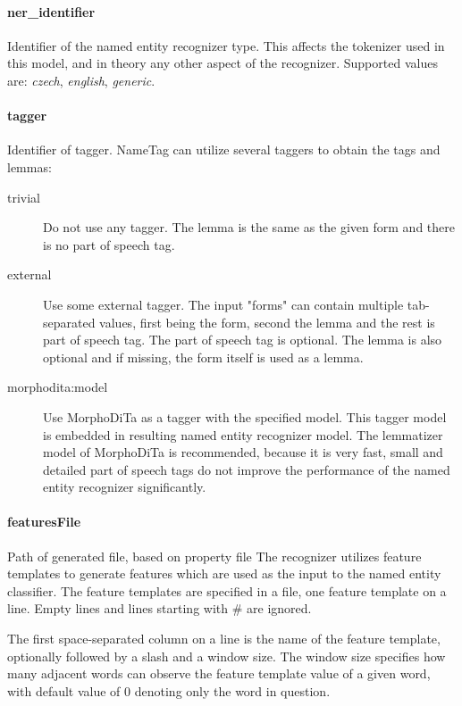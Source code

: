 \paragraph{ner\_identifier}
Identifier of the named entity recognizer type. This affects the tokenizer used
in this model, and in theory any other aspect of the recognizer. Supported values
are: \emph{czech}, \emph{english}, \emph{generic}.

\paragraph{tagger}
Identifier of tagger. NameTag can utilize several taggers to obtain the tags and lemmas:

\begin{description}
\item[trivial]
Do not use any tagger. The lemma is the same as the given form and there is no
part of speech tag.
\item[external]
Use some external tagger. The input "forms" can contain multiple tab-separated
values, first being the form, second the lemma and the rest is part of speech tag.
The part of speech tag is optional. The lemma is also optional and if missing,
the form itself is used as a lemma.
\item[morphodita:model]
Use MorphoDiTa as a tagger with the specified model. This tagger model is embedded
in resulting named entity recognizer model. The lemmatizer model of MorphoDiTa
is recommended, because it is very fast, small and detailed part of speech tags
do not improve the performance of the named entity recognizer significantly.
\end{description}

\paragraph{featuresFile}
Path of generated file, based on property file 
The recognizer utilizes feature templates to generate features which are used as
the input to the named entity classifier. The feature templates are specified in
a file, one feature template on a line. Empty lines and lines starting with \# are ignored.

The first space-separated column on a line is the name of the feature template,
optionally followed by a slash and a window size. The window size specifies how
many adjacent words can observe the feature template value of a given word, with
default value of 0 denoting only the word in question.

